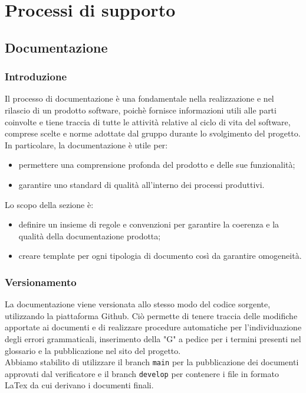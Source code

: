 \section{Processi di supporto}
\subsection{Documentazione}
\subsubsection{Introduzione}
Il processo di documentazione è una fondamentale nella realizzazione e nel rilascio di un prodotto software,
poichè fornisce informazioni utili alle parti coinvolte e tiene traccia di tutte le attività relative al ciclo di vita del software,
comprese scelte e norme adottate dal gruppo durante lo svolgimento del progetto. In particolare, la documentazione è utile per:
\begin{itemize}
	\item permettere una comprensione profonda del prodotto e delle sue funzionalità;
	\item garantire uno standard di qualità all'interno dei processi produttivi.
\end{itemize}
Lo scopo della sezione è:
\begin{itemize}
	\item definire un insieme di regole e convenzioni per garantire la coerenza e la qualità della documentazione prodotta;
	\item creare template per ogni tipologia di documento così da garantire omogeneità.
\end{itemize}

\subsubsection{Versionamento}
La documentazione viene versionata allo stesso modo del codice sorgente, utilizzando la piattaforma Github.
Ciò permette di tenere traccia delle modifiche apportate ai documenti e di realizzare procedure automatiche per l'individuazione degli errori grammaticali,
inserimento della "G" a pedice per i termini presenti nel glossario e la pubblicazione nel sito del progetto.\\
Abbiamo stabilito di utilizzare il branch \texttt{main} per la pubblicazione dei documenti approvati dal verificatore e il branch \texttt{develop} per contenere
i file in formato LaTex da cui derivano i documenti finali.

